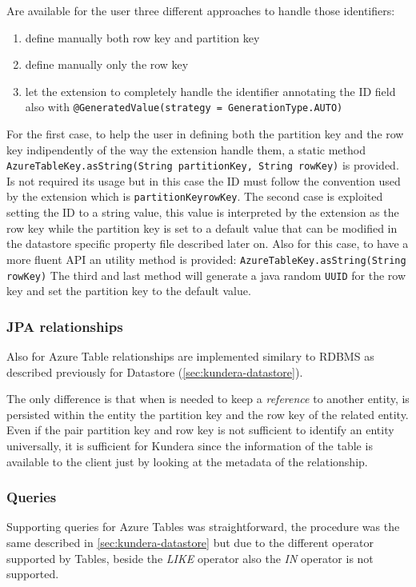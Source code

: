 \newparagraph Are available for the user three different approaches to handle those identifiers:
\begin{enumerate}
\item define manually both row key and partition key
\item define manually only the row key 
\item let the extension to completely handle the identifier annotating the ID field also with \texttt{@GeneratedValue(strategy = GenerationType.AUTO)}
\end{enumerate}

\noindent For the first case, to help the user in defining both the partition key and the row key indipendently of the way the extension handle them, a static method \texttt{AzureTableKey.asString(String partitionKey, String rowKey)} is provided. Is not required its usage but in this case the ID must follow the convention used by the extension which is \texttt{partitionKey\textunderscore rowKey}.
\noindent The second case is exploited setting the ID to a string value, this value is interpreted by the extension as the row key while the partition key is set to a default value that can be modified in the datastore specific property file described later on. Also for this case, to have a more fluent API an utility method is provided: \texttt{AzureTableKey.asString(String rowKey)} 
\noindent The third and last method will generate a java random \texttt{UUID} for the row key and set the partition key to the default value.

\subsubsection{JPA relationships}
Also for Azure Table relationships are implemented similary to RDBMS as described previously for Datastore (\ref{sec:kundera-datastore}).

\noindent The only difference is that when is needed to keep a \textit{reference} to another entity, is persisted within the entity the partition key and the row key of the related entity.
Even if the pair partition key and row key is not sufficient to identify an entity universally, it is sufficient for Kundera since the information of the table is available to the client just by looking at the metadata of the relationship. 

\subsubsection{Queries}
Supporting queries for Azure Tables was straightforward, the procedure was the same described in \ref{sec:kundera-datastore} but due to the different operator supported by Tables, beside the \textit{LIKE} operator also the \textit{IN} operator is not supported.


